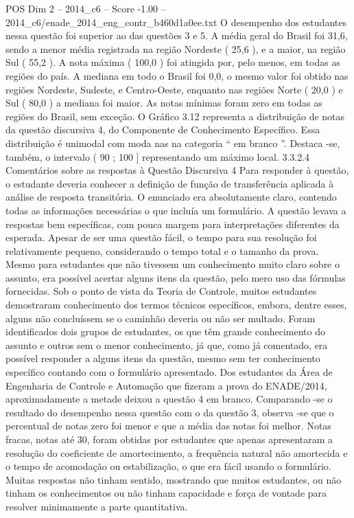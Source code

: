 \begin{textsample}{POS Dim 2 – 2014\_c6 – Score -1.00 – 2014\_c6/enade\_2014\_eng\_contr\_b460d1a0ee.txt}
O desempenho dos estudantes nessa questão foi superior ao das questões 3 e 5.
A média geral do Brasil foi 31,6, sendo a menor média registrada na região Nordeste ( 25,6 ), e a maior, na região Sul ( 55,2 ).
A nota máxima ( 100,0 ) foi atingida por, pelo menos, em todas as regiões do país.
A mediana em todo o Brasil foi 0,0, o mesmo valor foi obtido nas regiões Nordeste, Sudeste, e Centro-Oeste, enquanto nas regiões Norte ( 20,0 ) e Sul ( 80,0 ) a mediana foi maior.
As notas mínimas foram zero em todas as regiões do Brasil, sem exceção.
O Gráfico 3.12 representa a distribuição de notas da questão discursiva 4, do Componente de Conhecimento Específico.
Essa distribuição é unimodal com moda nas na categoria “ em branco ”.
Destaca -se, também, o intervalo ( 90 ; 100 ] representando um máximo local. 3.3.2.4 Comentários sobre as respostas à Questão Discursiva 4 Para responder à questão, o estudante deveria conhecer a definição de função de transferência aplicada à análise de resposta transitória.
O enunciado era absolutamente claro, contendo todas as informações necessárias o que incluía um formulário.
A questão levava a respostas bem específicas, com pouca margem para interpretações diferentes da esperada.
Apesar de ser uma questão fácil, o tempo para sua resolução foi relativamente pequeno, considerando o tempo total e o tamanho da prova.
Mesmo para estudantes que não tivessem um conhecimento muito claro sobre o assunto, era possível acertar alguns itens da questão, pelo mero uso das fórmulas fornecidas.
Sob o ponto de vista da Teoria de Controle, muitos estudantes demostraram conhecimento dos termos técnicos específicos, embora, dentre esses, alguns não concluíssem se o caminhão deveria ou não ser multado.
Foram identificados dois grupos de estudantes, os que têm grande conhecimento do assunto e outros sem o menor conhecimento, já que, como já comentado, era possível responder a alguns itens da questão, mesmo sem ter conhecimento específico contando com o formulário apresentado.
Dos estudantes da Área de Engenharia de Controle e Automação que fizeram a prova do ENADE/2014, aproximadamente a metade deixou a questão 4 em branco.
Comparando -se o resultado do desempenho nessa questão com o da questão 3, observa -se que o percentual de notas zero foi menor e que a média das notas foi melhor.
Notas fracas, notas até 30, foram obtidas por estudantes que apenas apresentaram a resolução do coeficiente de amortecimento, a frequência natural não amortecida e o tempo de acomodação ou estabilização, o que era fácil usando o formulário.
Muitas respostas não tinham sentido, mostrando que muitos estudantes, ou não tinham os conhecimentos ou não tinham capacidade e força de vontade para resolver minimamente a parte quantitativa.

\end{textsample}
